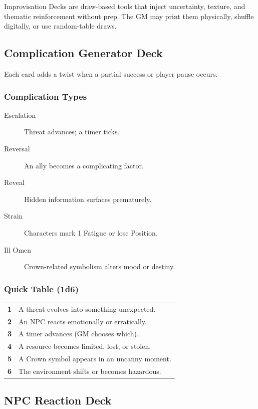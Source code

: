 \documentclass[11pt]{article}
\begin{document}
Improvisation Decks are draw-based tools that inject uncertainty, texture, and thematic 
reinforcement without prep. The GM may print them physically, shuffle digitally, or use 
random-table draws.

\subsection{Complication Generator Deck}
Each card adds a twist when a partial success or player pause occurs.

\subsubsection{Complication Types}
\begin{description}
    \item[Escalation] Threat advances; a timer ticks.
    \item[Reversal] An ally becomes a complicating factor.
    \item[Reveal] Hidden information surfaces prematurely.
    \item[Strain] Characters mark 1 Fatigue or lose Position.
    \item[Ill Omen] Crown-related symbolism alters mood or destiny.
\end{description}

\subsubsection{Quick Table (1d6)}
\begin{center}
\begin{longtable}{|c|p{9cm}|}
\hline
\textbf{1} & A threat evolves into something unexpected. \\
\textbf{2} & An NPC reacts emotionally or erratically. \\
\textbf{3} & A timer advances (GM chooses which). \\
\textbf{4} & A resource becomes limited, lost, or stolen. \\
\textbf{5} & A Crown symbol appears in an uncanny moment. \\
\textbf{6} & The environment shifts or becomes hazardous. \\
\hline
\end{longtable}
\end{center}

\subsection{NPC Reaction Deck}
\end{document}
